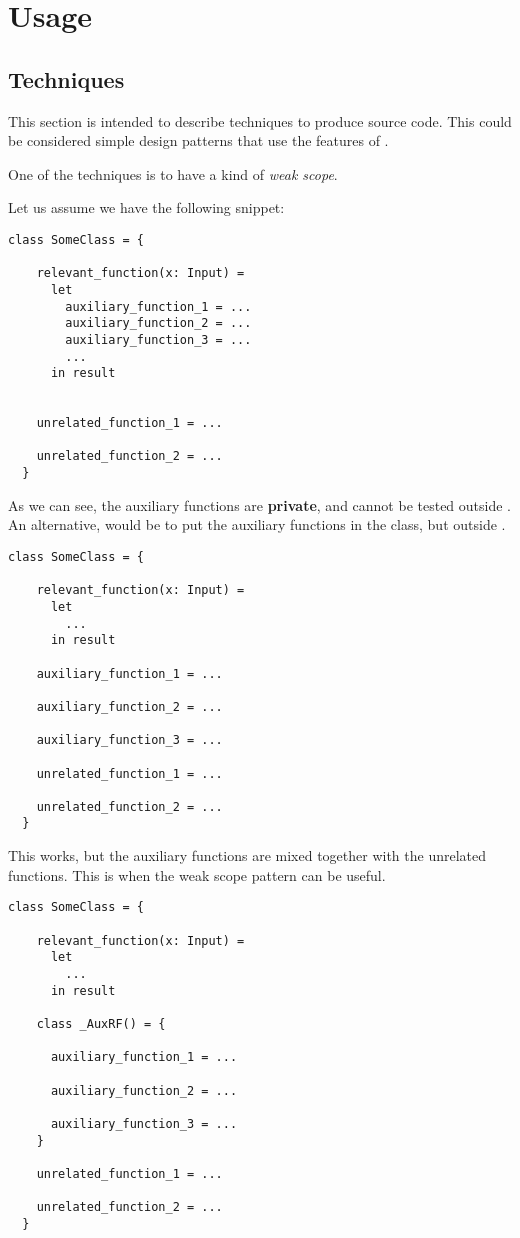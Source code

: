 \chapter{Usage}

\section{Techniques}

This section is intended to describe techniques to produce \Soda source code.
This could be considered simple design patterns that use the features of \Soda.

One of the techniques is to have a kind of \textit{weak scope}.

Let us assume we have the following snippet:
\begin{lstlisting}[label={lst:techniquesWeakScope0}]
  class SomeClass = {

    relevant_function(x: Input) =
      let
        auxiliary_function_1 = ...
        auxiliary_function_2 = ...
        auxiliary_function_3 = ...
        ...
      in result


    unrelated_function_1 = ...

    unrelated_function_2 = ...
  }
\end{lstlisting}

As we can see, the auxiliary functions are \textbf{private}, and cannot be tested outside .
An alternative, would be to put the auxiliary functions in the class, but outside .

\begin{lstlisting}[label={lst:techniquesWeakScope1}]
  class SomeClass = {

    relevant_function(x: Input) =
      let
        ...
      in result

    auxiliary_function_1 = ...

    auxiliary_function_2 = ...

    auxiliary_function_3 = ...

    unrelated_function_1 = ...

    unrelated_function_2 = ...
  }
\end{lstlisting}

This works, but the auxiliary functions are mixed together with the unrelated functions.
This is when the weak scope pattern can be useful.

\begin{lstlisting}[label={lst:techniquesWeakScope2}]
  class SomeClass = {

    relevant_function(x: Input) =
      let
        ...
      in result

    class _AuxRF() = {

      auxiliary_function_1 = ...

      auxiliary_function_2 = ...

      auxiliary_function_3 = ...
    }

    unrelated_function_1 = ...

    unrelated_function_2 = ...
  }
\end{lstlisting}

